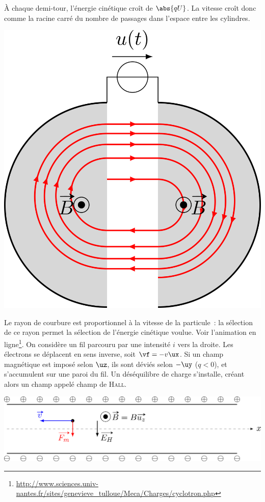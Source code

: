 \documentclass[../../main/main.tex]{subfiles}
\begin{document}
\begin{itemize}[label=$\diamond$]
\begin{itemize}
	\end{itemize}
	À chaque demi-tour, l'énergie cinétique croît de $\abs{qU}$. La vitesse croît
	donc comme la racine carré du nombre de passages dans l'espace entre les
	cylindres.
	\begin{center}
		\includegraphics[scale=1]{cyclotron}
		\label{fig:cyclotron}
	\end{center}
	Le rayon de courbure est proportionnel à la vitesse de la particule~: la
	sélection de ce rayon permet la sélection de l'énergie cinétique
	voulue. Voir l'animation en
	ligne\footnote{\url{http://www.sciences.univ-nantes.fr/sites/genevieve_tulloue/Meca/Charges/cyclotron.php}}.
	\bigbreak
	 On considère un fil parcouru par une intensité
	$i$ vers la droite. Les électrons se déplacent en sens inverse, soit
	$\vf = -v\ux$. Si un champ magnétique est imposé selon $\uz$, ils sont
	déviés selon $-\uy$ ($q < 0$), et s'accumulent sur une paroi du fil. Un
	déséquilibre de charge s'installe, créant alors un champ appelé champ de
	\textsc{Hall}.
	\begin{center}
		\includegraphics[scale=1]{effet_hall}

\end{center}
\end{itemize}
\end{document}
